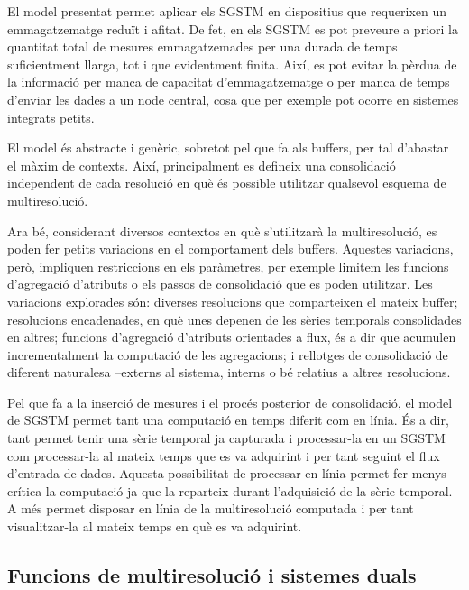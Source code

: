 El model presentat permet aplicar els \gls{SGSTM} en dispositius que
requerixen un emmagatzematge reduït i afitat. De fet, en els
\gls{SGSTM} es pot preveure a priori la quantitat total de mesures
emmagatzemades per una durada de temps suficientment llarga, tot i que
evidentment finita. Així, es pot evitar la pèrdua de la informació per
manca de capacitat d'emmagatzematge o per manca de temps d'enviar les
dades a un node central, cosa que per exemple pot ocorre en sistemes
integrats petits. 


El model és abstracte i genèric, sobretot pel que fa als buffers, per
tal d'abastar el màxim de contexts. Així, principalment es defineix
una consolidació independent de cada resolució en què és possible
utilitzar qualsevol esquema de multiresolució.



Ara bé, considerant diversos contextos en què s'utilitzarà la
multiresolució, es poden fer petits variacions en el comportament dels
buffers. Aquestes variacions, però, impliquen restriccions en els
paràmetres, per exemple limitem les funcions d'agregació d'atributs o
els passos de consolidació que es poden utilitzar.  Les variacions
explorades són: diverses resolucions que comparteixen el mateix
buffer; resolucions encadenades, en què unes depenen de les sèries
temporals consolidades en altres; funcions d'agregació d'atributs
orientades a flux, és a dir que acumulen incrementalment la computació
de les agregacions; i rellotges de consolidació de diferent
naturalesa --externs al sistema, interns o bé relatius a altres
resolucions.




Pel que fa a la inserció de mesures i el procés posterior de
consolidació, el model de \gls{SGSTM} permet tant una computació en
temps diferit com en línia. És a dir, tant permet tenir una sèrie
temporal ja capturada i processar-la en un \gls{SGSTM} com
processar-la al mateix temps que es va adquirint i per tant seguint el
flux d'entrada de dades.  Aquesta possibilitat de processar en línia
permet fer menys crítica la computació ja que la reparteix durant
l'adquisició de la sèrie temporal. A més permet disposar en línia de
la multiresolució computada i per tant visualitzar-la al mateix temps
en què es va adquirint.






\subsection{Funcions de multiresolució i sistemes duals}


